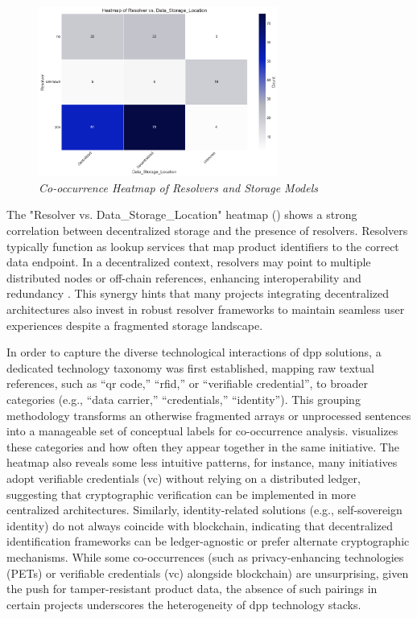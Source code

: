 \begin{figure}[htbp]
  \centering
  \includegraphics[width=0.7\textwidth]{figures/initiatives_resolver_vs_storage.png}
  \caption{%
    \textit{Co-occurrence Heatmap of Resolvers and Storage Models} 
  }
  \label{fig:initiatives_resolver_vs_storage}
\end{figure}

The "Resolver vs. Data\_Storage\_Location" heatmap () shows a strong correlation between decentralized storage and the presence of resolvers. Resolvers typically function as lookup services that map product identifiers to the correct data endpoint. In a decentralized context, resolvers may point to multiple distributed nodes or off-chain references, enhancing interoperability and redundancy \autocite{Liu.2022}. This synergy hints that many projects integrating decentralized architectures also invest in robust resolver frameworks to maintain seamless user experiences despite a fragmented storage landscape.

In order to capture the diverse technological interactions of \ac{dpp} solutions, a dedicated technology taxonomy was first established, mapping raw textual references, such as “qr code,” “rfid,” or “verifiable credential”, to broader categories (e.g., “data carrier,” “credentials,” “identity”). This grouping methodology transforms an otherwise fragmented arrays or unprocessed sentences into a manageable set of conceptual labels for co-occurrence analysis.  visualizes these categories and how often they appear together in the same initiative. The heatmap also reveals some less intuitive patterns, for instance, many initiatives adopt verifiable credentials (\ac{vc}) without relying on a distributed ledger, suggesting that cryptographic verification can be implemented in more centralized architectures. Similarly, identity-related solutions (e.g., self-sovereign identity) do not always coincide with blockchain, indicating that decentralized identification frameworks can be ledger-agnostic or prefer alternate cryptographic mechanisms. While some co-occurrences (such as privacy-enhancing technologies (PETs) or verifiable credentials (\ac{vc}) alongside blockchain) are unsurprising, given the push for tamper-resistant product data, the absence of such pairings in certain projects underscores the heterogeneity of \ac{dpp} technology stacks. \autocite{Narayanan.2016}

